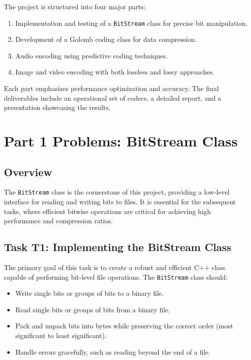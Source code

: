 \documentclass[11pt,twoside,a4paper]{report}
\begin{document}
The project is structured into four major parts:
\begin{enumerate}
    \item Implementation and testing of a \texttt{BitStream} class for precise bit manipulation.
    \item Development of a Golomb coding class for data compression.
    \item Audio encoding using predictive coding techniques.
    \item Image and video encoding with both lossless and lossy approaches.
\end{enumerate}

Each part emphasizes performance optimization and accuracy. The final deliverables include an operational set of codecs, a detailed report, and a presentation showcasing the results.

\chapter{Part 1 Problems: BitStream Class}

\section{Overview}
The \texttt{BitStream} class is the cornerstone of this project, providing a low-level interface for reading and writing bits to files. It is essential for the subsequent tasks, where efficient bitwise operations are critical for achieving high performance and compression ratios.

\section{Task T1: Implementing the BitStream Class}
The primary goal of this task is to create a robust and efficient C++ class capable of performing bit-level file operations. The \texttt{BitStream} class should:
\begin{itemize}
    \item Write single bits or groups of bits to a binary file.
    \item Read single bits or groups of bits from a binary file.
    \item Pack and unpack bits into bytes while preserving the correct order (most significant to least significant).
    \item Handle errors gracefully, such as reading beyond the end of a file.
\end{itemize}
\end{document}
